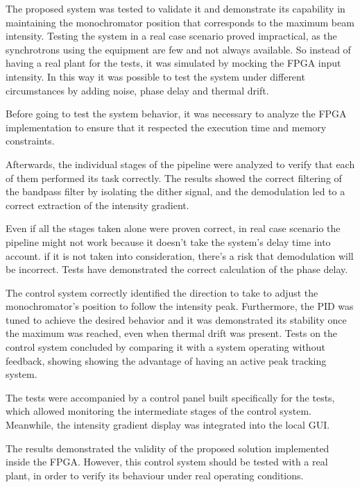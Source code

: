 The proposed system was tested to validate it and demonstrate its capability in maintaining the monochromator position that corresponds to the maximum beam intensity.
Testing the system in a real case scenario proved impractical, as the synchrotrons using the equipment are few and not always available.
So instead of having a real plant for the tests, it was simulated by mocking the FPGA input intensity.
In this way it was possible to test the system under different circumstances by adding noise, phase delay and thermal drift.

Before going to test the system behavior, it was necessary to analyze the FPGA implementation to ensure that it respected the execution time and memory constraints.

Afterwards, the individual stages of the pipeline were analyzed to verify that each of them performed its task correctly.
The results showed the correct filtering of the bandpass filter by isolating the dither signal, and the demodulation led to a correct extraction of the intensity gradient.

Even if all the stages taken alone were proven correct, in real case scenario the pipeline might not work because it doesn't take the system's delay time into account. 
if it is not taken into consideration, there's a risk that demodulation will be incorrect.
Tests have demonstrated the correct calculation of the phase delay.

The control system correctly identified the direction to take to adjust the monochromator's position to follow the intensity peak. 
Furthermore, the PID was tuned to achieve the desired behavior and it was demonstrated its stability once the maximum was reached, even when thermal drift was present. 
Tests on the control system concluded by comparing it with a system operating without feedback, showing showing the advantage of having an active peak tracking system.

The tests were accompanied by a control panel built specifically for the tests, which allowed monitoring the intermediate stages of the control system. Meanwhile, the intensity gradient display was integrated into the local GUI.

The results demonstrated the validity of the proposed solution implemented inside the FPGA.
However, this control system should be tested with a real plant, in order to verify its behaviour under real operating conditions.

\newpage